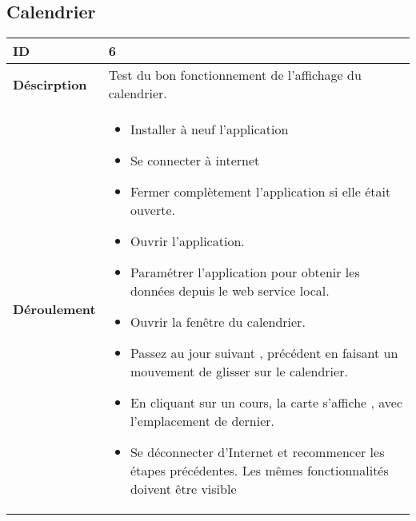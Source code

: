 		\subsection{Calendrier}
					 \begin{longtable}{m{4cm}|p{10cm}|}
					 \textbf{ ID} & 6 \\
					 \hline \textbf{Déscirption} & Test du bon fonctionnement de l'affichage du calendrier.\\
					 \hline \textbf{Déroulement} &
						 \begin{itemize}
						  	\item Installer à neuf l'application
						  	\item Se connecter à internet
							 \item Fermer complètement l'application si elle était ouverte.
							 \item Ouvrir l'application.
							 \item Paramétrer l'application pour obtenir les données depuis le web service local.
							 \item Ouvrir la fenêtre du calendrier.
							 \item Passez au jour suivant , précédent en faisant un mouvement de glisser sur le calendrier.
							 \item En cliquant sur un cours, la carte s'affiche , avec l'emplacement de dernier. 
							\item Se déconnecter d'Internet et recommencer les étapes précédentes. Les mêmes fonctionnalités doivent être visible
						 \end{itemize}
					 \\
				 \end{longtable}

